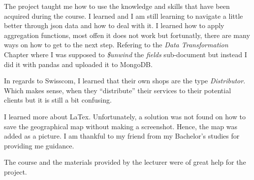 \documentclass[11pt]{article}
\begin{document}
    The project taught me how to use the knowledge and skills that have been
acquired during the course. I learned and I am still learning to
navigate a little better through json data and how to deal with it. I
learned how to apply aggregation functions, most offen it does not work
but fortunatly, there are many ways on how to get to the next step.
Refering to the \emph{Data Transformation} Chapter where I was supposed
to \emph{\$unwind} the \emph{fields} sub-document but instead I did it
with pandas and uploaded it to MongoDB.

In regards to Swisscom, I learned that their own shops are the type
\emph{Distributor}. Which makes sense, when they ``distribute'' their
services to their potential clients but it is still a bit confusing.

I learned more about LaTex. Unfortunately, a solution was not found on how to 
save the geographical map without making a screenshot. Hence, the map was added 
as a picture. 
I am thankful to my friend from my Bachelor's studies for providing me guidance.

The course and the materials provided by the lecturer were of great help
for the project.

   
    
    
    
\end{document}
